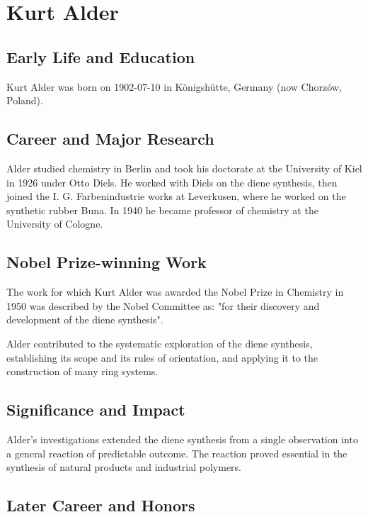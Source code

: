 \section{Kurt Alder}

\subsection*{Early Life and Education}

Kurt Alder was born on 1902-07-10 in K{\"o}nigsh{\"u}tte, Germany (now Chorz{\'o}w, Poland).

\subsection*{Career and Major Research}

Alder studied chemistry in Berlin and took his doctorate at the University of Kiel in 1926 under Otto Diels. He worked with Diels on the diene synthesis, then joined the I. G. Farbenindustrie works at Leverkusen, where he worked on the synthetic rubber Buna. In 1940 he became professor of chemistry at the University of Cologne.

\subsection*{Nobel Prize-winning Work}

The work for which Kurt Alder was awarded the Nobel Prize in Chemistry in 1950 was described by the Nobel Committee as: "for their discovery and development of the diene synthesis".

Alder contributed to the systematic exploration of the diene synthesis, establishing its scope and its rules of orientation, and applying it to the construction of many ring systems.

\subsection*{Significance and Impact}

Alder's investigations extended the diene synthesis from a single observation into a general reaction of predictable outcome. The reaction proved essential in the synthesis of natural products and industrial polymers.

\subsection*{Later Career and Honors}


